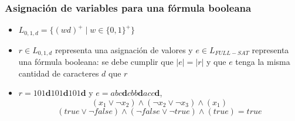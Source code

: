 \documentclass{beamer}
\begin{document}
\begin{frame}
    \frametitle{Asignación de variables para una fórmula booleana}

    \begin{itemize}
        \item $L_{0,1,d}=\{(wd)^+\mid w\in\{0,1\}^+\}$
        \item $r\in L_{0,1,d}$ representa una asignación de valores y $e\in L_{FULL-SAT}$ representa una fórmula booleana:
              se debe cumplir que $|e|=|r|$ y que $e$ tenga la misma cantidad de caracteres $d$ que $r$
        \item $r=101\mathbf{d}101\mathbf{d}101\mathbf{d}$ y $e=abc\mathbf{d}cbb\mathbf{d}acc\mathbf{d}$,
              $$(x_1\vee\neg x_2)\wedge (\neg x_2 \vee \neg x_3)\wedge (x_1)$$
              $$(true\vee\neg false)\wedge (\neg false \vee \neg true)\wedge (true)=true$$
    \end{itemize}

\end{frame}
\end{document}
